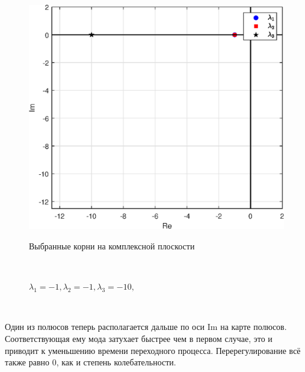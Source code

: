 \documentclass[a4paper]{article}
\begin{document}
\begin{figure}[H]
\begin{minipage}{0.5\textwidth}
        \centering \includegraphics[width=\textwidth]{ex2/complex_plan_-1_-1_-10.eps}
        \caption{$\lambda_1=-1, \lambda_2=-1, \lambda_3=-10,$}
        \centerline{Выбранные корни на комплексной плоскости}
    \end{minipage}\\[1em]
\end{figure}\noindent\

Один из полюсов теперь располагается дальше по оси $\text{Im}$ на карте полюсов. Соответствующая ему мода затухает быстрее чем в первом случае, это и приводит к уменьшению времени переходного процесса. Перерегулирование всё также равно 0, как и степень колебательности.
\end{document}
